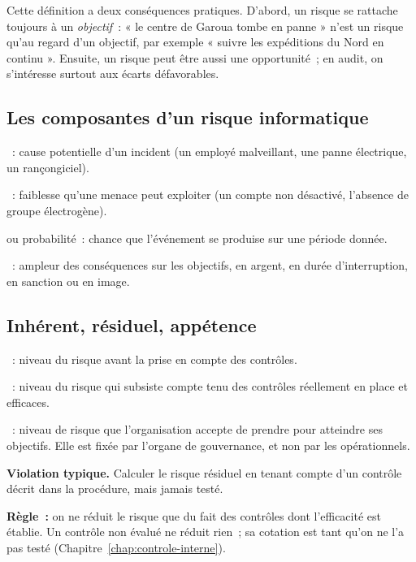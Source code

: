 \medskip

Cette définition a deux conséquences pratiques. D'abord, un risque se
rattache toujours à un \emph{objectif}~: « le centre de Garoua tombe en
panne » n'est un risque qu'au regard d'un objectif, par exemple « suivre
les expéditions du Nord en continu ». Ensuite, un risque peut être aussi
une opportunité~; en audit, on s'intéresse surtout aux écarts défavorables.

\subsection{Les composantes d'un risque informatique}

\begin{boxdef}
~: cause potentielle d'un incident (un employé
malveillant, une panne électrique, un rançongiciel).

\medskip
{}~: faiblesse qu'une menace peut
exploiter (un compte non désactivé, l'absence de groupe électrogène).

\medskip
{} ou probabilité~: chance que
l'événement se produise sur une période donnée.

\medskip
{}~: ampleur des conséquences sur les
objectifs, en argent, en durée d'interruption, en sanction ou en image.
\end{boxdef}

\subsection{Inhérent, résiduel, appétence}

\begin{boxdef}
~: niveau du risque avant
la prise en compte des contrôles.

\medskip
{}~: niveau du risque qui
subsiste compte tenu des contrôles réellement en place et efficaces.

\medskip
{}~: niveau de risque
que l'organisation accepte de prendre pour atteindre ses objectifs. Elle est
fixée par l'organe de gouvernance, et non par les opérationnels.
\end{boxdef}

\begin{boxalert}
\textbf{Violation typique.} Calculer le risque résiduel en tenant compte
d'un contrôle décrit dans la procédure, mais jamais testé.

\smallskip
\textbf{Règle~:} on ne réduit le risque que du fait des contrôles dont
l'efficacité est établie. Un contrôle non évalué ne réduit rien~; sa cotation
est \NEK{} tant qu'on ne l'a pas testé (Chapitre~\ref{chap:controle-interne}).
\end{boxalert}

